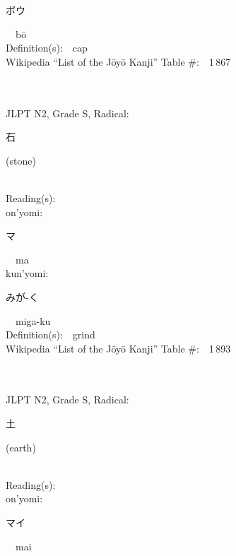 \begin{multicols}{2}
{\hspace*{2em}}{\begin{CJK}{UTF8}{min} ボウ \end{CJK}}\ \ b\=o\ \ \\
Definition(s):\ \ cap \\
Wikipedia ``List of the J\=oy\=o Kanji'' Table \#:\ \ 1\,867 \\
\ \ \\
{\fontsize{34pt}{40pt}  }\ \ \\  %
{JLPT N2, Grade S, Radical:\ \ {\begin{CJK}{UTF8}{min} 石 \end{CJK}} (stone) } \\
Reading(s):\ \ \\
{\hspace*{1em}}on'yomi:\ \ \\
{\hspace*{2em}}{\begin{CJK}{UTF8}{min} マ \end{CJK}}\ \ ma\ \ \\
{\hspace*{1em}}kun'yomi:\ \ \\
{\hspace*{2em}}{\begin{CJK}{UTF8}{min} みが-く \end{CJK}}\ \ miga-ku\ \ \\
Definition(s):\ \ grind \\
Wikipedia ``List of the J\=oy\=o Kanji'' Table \#:\ \ 1\,893 \\
\ \ \\
{\fontsize{34pt}{40pt}  }\ \ \\  %
{JLPT N2, Grade S, Radical:\ \ {\begin{CJK}{UTF8}{min} 土 \end{CJK}} (earth) } \\
Reading(s):\ \ \\
{\hspace*{1em}}on'yomi:\ \ \\
{\hspace*{2em}}{\begin{CJK}{UTF8}{min} マイ \end{CJK}}\ \ mai\ \ \\

\end{multicols}
